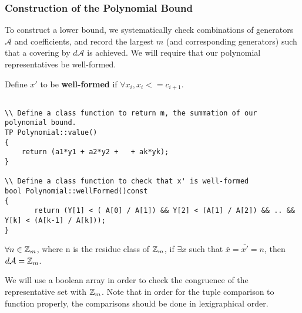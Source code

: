 \subsubsection{Construction of the Polynomial Bound}

To construct a lower bound, we systematically check combinations of generators $\mathcal{A}$ and coefficients, and record the largest $m$ (and corresponding generators) such that a covering by $d \mathcal{A}$ is achieved.\n
We will require that our polynomial representatives be well-formed.

\begin{proposition}
Define $x'$ to be \textbf{well-formed} if $\forall x_i, x_i <= c_{i+1}$.  
\end{proposition}

\begin{lstlisting}

\\ Define a class function to return m, the summation of our polynomial bound.
TP Polynomial::value()
{
    return (a1*y1 + a2*y2 +   + ak*yk);
}

\\ Define a class function to check that x' is well-formed
bool Polynomial::wellFormed()const
{
       return (Y[1] < ( A[0] / A[1]) && Y[2] < (A[1] / A[2]) && .. && Y[k] < (A[k-1] / A[k]));
}

\end{lstlisting}

\begin{proposition}
$\forall n \in \mbox{$\mathbb Z$}_m$, where n is the residue class of $\mbox{$\mathbb Z$}_m$, if $\exists  x$ such that $\bar{x} = \bar{x'}= n$, then $d \mathcal{A} = \mbox{$\mathbb Z$}_m$.\n
\end{proposition}

\noindent
We will use a boolean array in order to check the congruence of the representative set with $\mbox{$\mathbb Z$}_m$. Note that in order for the tuple comparison to function properly, the comparisons should be done in lexigraphical order.

